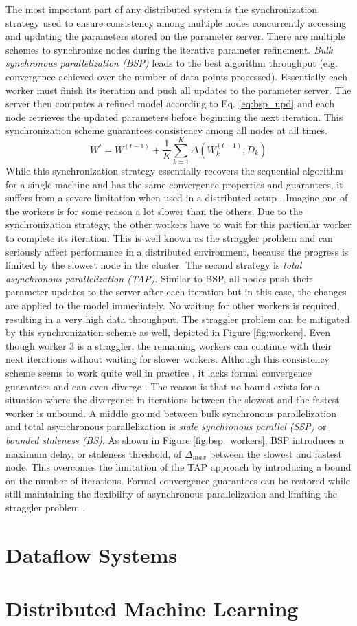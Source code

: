 The most important part of any distributed system is the synchronization strategy used to ensure consistency among multiple nodes concurrently accessing and updating the parameters stored on the parameter server. There are multiple schemes to synchronize nodes during the iterative parameter refinement. \textit{Bulk synchronous parallelization (BSP)} leads to the best algorithm throughput (e.g. convergence achieved over the number of data points processed). Essentially each worker must finish its iteration and push all updates to the parameter server. The server then computes a refined model according to Eq. \ref{eq:bsp_upd} and each node retrieves the updated parameters before beginning the next iteration. This synchronization scheme guarantees consistency among all nodes at all times.
\begin{equation}
W^{t} = W^{(t-1)} + \frac{1}{K}\sum_{k=1}^{K}\Delta(W^{(t-1)}_{k}, D_{k})
\label{eq:bsp_upd}
\end{equation}
While this synchronization strategy essentially recovers the sequential algorithm for a single machine and has the same convergence properties and guarantees, it suffers from a severe limitation when used in a distributed setup \cite{langford2009slow}. Imagine one of the workers is for some reason a lot slower than the others. Due to the synchronization strategy, the other workers have to wait for this particular worker to complete its iteration. This is well known as the straggler problem \cite{ananthanarayanan2013effective} and can seriously affect performance in a distributed environment, because the progress is limited by the slowest node in the cluster.
The second strategy is \textit{total asynchronous parallelization (TAP)}. Similar to BSP, all nodes push their parameter updates to the server after each iteration but in this case, the changes are applied to the model immediately. No waiting for other workers is required, resulting in a very high data throughput. The straggler problem can be mitigated by this synchronization scheme as well, depicted in Figure \ref{fig:workers}. Even though worker 3 is a straggler, the remaining workers can continue with their next iterations without waiting for slower workers. Although this consistency scheme seems to work quite well in practice \cite{li2014scaling}, it lacks formal convergence guarantees and can even diverge \cite{dai2014high}. The reason is that no bound exists for a situation where the divergence in iterations between the slowest and the fastest worker is unbound.
A middle ground between bulk synchronous parallelization and total asynchronous parallelization is \textit{stale synchronous parallel (SSP)} \cite{ho2013more} or \textit{bounded staleness (BS)}. As shown in Figure \ref{fig:bsp_workers}, BSP introduces a maximum delay, or staleness threshold, of $\Delta_{max}$ between the slowest and fastest node. This overcomes the limitation of the TAP approach by introducing a bound on the number of iterations. Formal convergence guarantees can be restored while still maintaining the flexibility of asynchronous parallelization and limiting the straggler problem \cite{cipar2013solving}.

\section{Dataflow Systems}

\section{Distributed Machine Learning}


